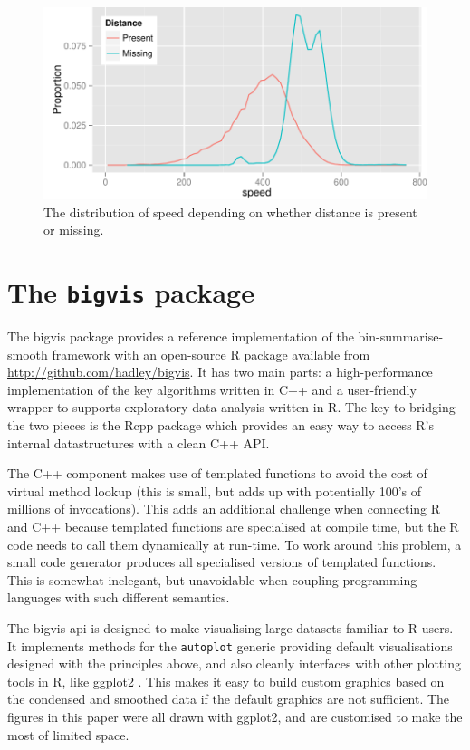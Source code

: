 \documentclass[journal]{vgtc}                %
\begin{document}
\begin{figure}
  \centering
   \includegraphics[width=\linewidth]{speed-distance}
 \caption{The distribution of speed depending on whether distance is present or missing.}
 \label{fig:missing}
\end{figure}

\section{The {\tt bigvis} package}
\label{sec:bigvis}

The bigvis package provides a reference implementation of the bin-summarise-smooth framework with an open-source R package available from \url{http://github.com/hadley/bigvis}. It has two main parts: a high-performance implementation of the key algorithms written in C++ and a user-friendly wrapper to supports exploratory data analysis written in R. The key to bridging the two pieces is the Rcpp package \citep{eddelbuettel:2011} which provides an easy way to access R's internal datastructures with a clean C++ API. 

The C++ component makes use of templated functions to avoid the cost of virtual method lookup (this is small, but adds up with potentially 100's of millions of invocations). This adds an additional challenge when connecting R and C++ because templated functions are specialised at compile time, but the R code needs to call them dynamically at run-time. To work around this problem, a small code generator produces all specialised versions of templated functions. This is somewhat inelegant, but unavoidable when coupling programming languages with such different semantics.

The bigvis {\sc api} is designed to make visualising large datasets familiar to R users. It implements methods for the {\tt autoplot} generic providing default visualisations designed with the principles above, and also cleanly interfaces with other plotting tools in R, like ggplot2 \citep{me:ggplot2,wickham:2007d}. This makes it easy to build custom graphics based on the condensed and smoothed data if the default graphics are not sufficient. The figures in this paper were all drawn with ggplot2, and are customised to make the most of limited space.
\end{document}
